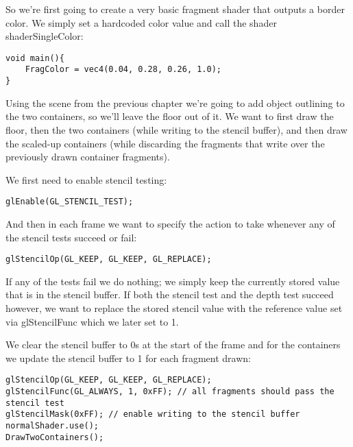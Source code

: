 \documentclass{article}
\begin{document}
So we're first going to create a very basic fragment shader that outputs a border color. We simply set a hardcoded color value and call the shader shaderSingleColor:


\begin{lstlisting}
void main(){
    FragColor = vec4(0.04, 0.28, 0.26, 1.0);
}
\end{lstlisting}

Using the scene from the previous chapter we're going to add object outlining to the two containers, so we'll leave the floor out of it. We want to first draw the floor, then the two containers (while writing to the stencil buffer), and then draw the scaled-up containers (while discarding the fragments that write over the previously drawn container fragments).

We first need to enable stencil testing:

\begin{lstlisting}
glEnable(GL_STENCIL_TEST);
\end{lstlisting}

And then in each frame we want to specify the action to take whenever any of the stencil tests succeed or fail:

\begin{lstlisting}
glStencilOp(GL_KEEP, GL_KEEP, GL_REPLACE);  
\end{lstlisting}

If any of the tests fail we do nothing; we simply keep the currently stored value that is in the stencil buffer. If both the stencil test and the depth test succeed however, we want to replace the stored stencil value with the reference value set via glStencilFunc which we later set to 1.

We clear the stencil buffer to 0s at the start of the frame and for the containers we update the stencil buffer to 1 for each fragment drawn:


\begin{lstlisting}
glStencilOp(GL_KEEP, GL_KEEP, GL_REPLACE);  
glStencilFunc(GL_ALWAYS, 1, 0xFF); // all fragments should pass the stencil test
glStencilMask(0xFF); // enable writing to the stencil buffer
normalShader.use();
DrawTwoContainers();
\end{lstlisting}
\end{document}
